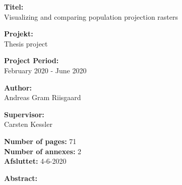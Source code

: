\setcounter{page}{1}


\vspace*{1cm}

\begin{minipage}[t]{0.48\textwidth}
\textbf{Titel:} \\[5pt]\hspace{2ex}
Visualizing and comparing population 
projection rasters

\vspace*{1cm}

\textbf{Projekt:} \\[5pt]\bigskip\hspace{2ex}
Thesis project

\textbf{Project Period:} \\[5pt]\bigskip\hspace{2ex}
February 2020 - June 2020

\textbf{Author:} \\[5pt]\hspace*{2ex}
Andreas Gram Riisgaard 
\\\bigskip\hspace{2ex}


\textbf{Supervisor:} \\[5pt]\hspace*{2ex}
Carsten Kessler \\\bigskip\hspace{2ex}




\textbf{Number of pages:} 71 \\
\textbf{Number of annexes:} 2 \\ 
\textbf{Afsluttet:} 4-6-2020
 
\end{minipage}
\hfill
\begin{minipage}[t]{0.8\textwidth}%
 \textbf{Abstract:} \\[3pt]
 \fbox{\parbox{8cm}{\bigskip\bigskip}}
\end{minipage}
